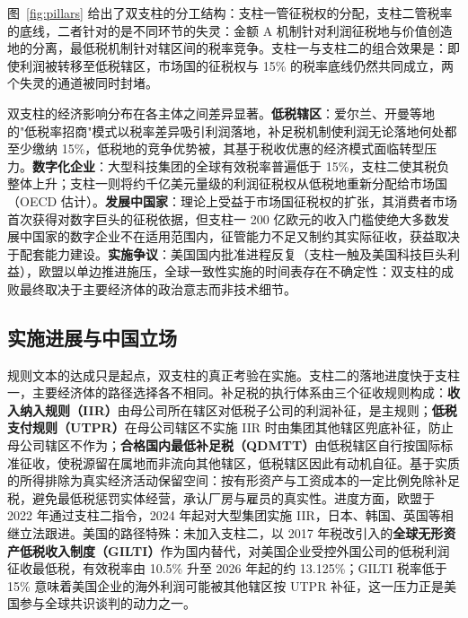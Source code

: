 图~\ref{fig:pillars} 给出了双支柱的分工结构：支柱一管征税权的分配，支柱二管税率的底线，二者针对的是不同环节的失灵：金额 A 机制针对利润征税地与价值创造地的分离，最低税机制针对辖区间的税率竞争。支柱一与支柱二的组合效果是：即使利润被转移至低税辖区，市场国的征税权与 15\% 的税率底线仍然共同成立，两个失灵的通道被同时封堵。

双支柱的经济影响分布在各主体之间差异显著。\textbf{低税辖区}：爱尔兰、开曼等地的"低税率招商"模式以税率差异吸引利润落地，补足税机制使利润无论落地何处都至少缴纳 15\%，低税地的竞争优势被，其基于税收优惠的经济模式面临转型压力。\textbf{数字化企业}：大型科技集团的全球有效税率普遍低于 15\%，支柱二使其税负整体上升；支柱一则将约千亿美元量级的利润征税权从低税地重新分配给市场国（OECD 估计）。\textbf{发展中国家}：理论上受益于市场国征税权的扩张，其消费者市场首次获得对数字巨头的征税依据，但支柱一 200 亿欧元的收入门槛使绝大多数发展中国家的数字企业不在适用范围内，征管能力不足又制约其实际征收，获益取决于配套能力建设。\textbf{实施争议}：美国国内批准进程反复（支柱一触及美国科技巨头利益），欧盟以单边推进施压，全球一致性实施的时间表存在不确定性：双支柱的成败最终取决于主要经济体的政治意志而非技术细节。

\subsection{实施进展与中国立场}

规则文本的达成只是起点，双支柱的真正考验在实施。支柱二的落地进度快于支柱一，主要经济体的路径选择各不相同。补足税的执行体系由三个征收规则构成：\textbf{收入纳入规则（IIR）}由母公司所在辖区对低税子公司的利润补征，是主规则；\textbf{低税支付规则（UTPR）}在母公司辖区不实施 IIR 时由集团其他辖区兜底补征，防止母公司辖区不作为；\textbf{合格国内最低补足税（QDMTT）}由低税辖区自行按国际标准征收，使税源留在属地而非流向其他辖区，低税辖区因此有动机自征。基于实质的所得排除为真实经济活动保留空间：按有形资产与工资成本的一定比例免除补足税，避免最低税惩罚实体经营，承认厂房与雇员的真实性。进度方面，欧盟于 2022 年通过支柱二指令，2024 年起对大型集团实施 IIR，日本、韩国、英国等相继立法跟进。美国的路径特殊：未加入支柱二，以 2017 年税改引入的\textbf{全球无形资产低税收入制度（GILTI）}作为国内替代，对美国企业受控外国公司的低税利润征收最低税，有效税率由 10.5\% 升至 2026 年起的约 13.125\%；GILTI 税率低于 15\% 意味着美国企业的海外利润可能被其他辖区按 UTPR 补征，这一压力正是美国参与全球共识谈判的动力之一。

